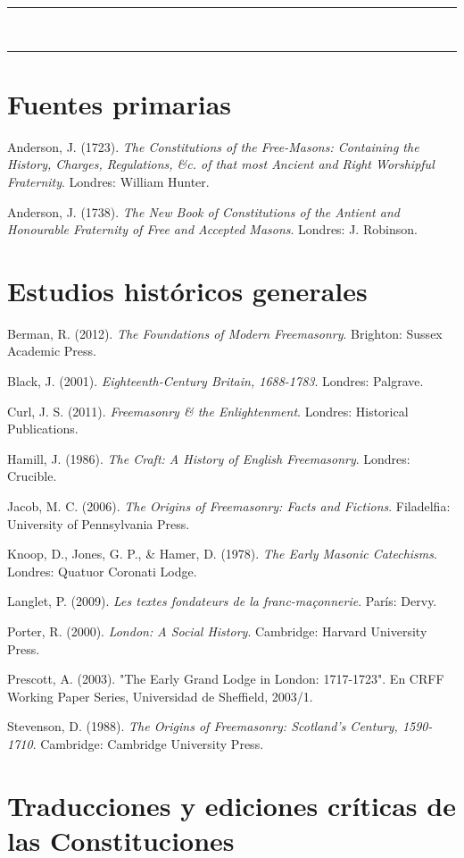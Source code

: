 \documentclass[a4paper,12pt,twoside]{book}
\newcommand{\ornline}{%
\begin{center}
\textcolor{dorado}{{\LARGE\rule{0.2\textwidth}{0.4pt}}~\scalebox{1.2}{❧}~\scalebox{1.2}{❧}~\scalebox{1.2}{❧}~
{\LARGE\rule{0.2\textwidth}{0.4pt}}}
\end{center}}
\begin{document}
\ornline
\vspace{1cm}

\section*{Fuentes primarias}

Anderson, J. (1723). \textit{The Constitutions of the Free-Masons: Containing the History, Charges, Regulations, \&c. of that most Ancient and Right Worshipful Fraternity}. Londres: William Hunter.

Anderson, J. (1738). \textit{The New Book of Constitutions of the Antient and Honourable Fraternity of Free and Accepted Masons}. Londres: J. Robinson.

\section*{Estudios históricos generales}

Berman, R. (2012). \textit{The Foundations of Modern Freemasonry}. Brighton: Sussex Academic Press.

Black, J. (2001). \textit{Eighteenth-Century Britain, 1688-1783}. Londres: Palgrave.

Curl, J. S. (2011). \textit{Freemasonry & the Enlightenment}. Londres: Historical Publications.

Hamill, J. (1986). \textit{The Craft: A History of English Freemasonry}. Londres: Crucible.

Jacob, M. C. (2006). \textit{The Origins of Freemasonry: Facts and Fictions}. Filadelfia: University of Pennsylvania Press.

Knoop, D., Jones, G. P., & Hamer, D. (1978). \textit{The Early Masonic Catechisms}. Londres: Quatuor Coronati Lodge.

Langlet, P. (2009). \textit{Les textes fondateurs de la franc-maçonnerie}. París: Dervy.

Porter, R. (2000). \textit{London: A Social History}. Cambridge: Harvard University Press.

Prescott, A. (2003). "The Early Grand Lodge in London: 1717-1723". En CRFF Working Paper Series, Universidad de Sheffield, 2003/1.

Stevenson, D. (1988). \textit{The Origins of Freemasonry: Scotland's Century, 1590-1710}. Cambridge: Cambridge University Press.

\section*{Traducciones y ediciones críticas de las Constituciones}
\end{document}

